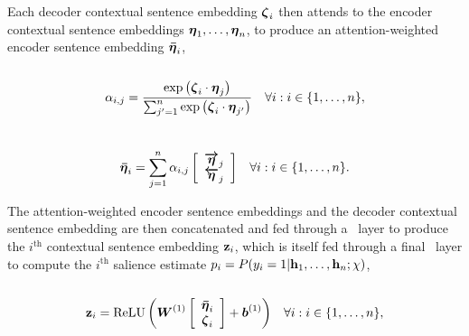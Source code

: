

\clearpage

Each decoder contextual sentence embedding $\boldsymbol{\zeta}_i$ then attends to
the encoder contextual sentence embeddings $\boldsymbol{\eta}_1,\ldots,
\boldsymbol{\eta}_n$, to produce an attention-weighted encoder sentence
embedding $\boldsymbol{\bar{\eta}}_i$,\\
    
\\[-20pt]
\begin{align}
    \alpha_{i,j} & = 
        \frac{\exp \left(\boldsymbol{\zeta}_i \cdot  \boldsymbol{\eta}_j \right)}{
            \sum_{j^\prime=1}^{n}\exp\left(  
                \boldsymbol{\zeta}_i \cdot  \boldsymbol{\eta}_{j^\prime} \right)} &
    \forall i : i \in \{1,\ldots,n\}, 
\end{align}
\\[-20pt]
\begin{align}
    \boldsymbol{\bar{\eta}}_i & = 
        \sum_{j=1}^{n} \alpha_{i,j} \left[\begin{array}{c}
            \boldsymbol{\overrightarrow{\eta}}_j\\ 
            \boldsymbol{\overleftarrow{\eta}}_j\end{array}\right] & 
    \forall i : i \in \{1,\ldots,n\}.
\end{align}

The attention-weighted encoder sentence embeddings and the decoder contextual
sentence embedding are then concatenated and fed through a \feedforward~layer
to produce the $i^\textrm{th}$ contextual sentence embedding $\mathbf{z}_i$,
which is itself fed through a final \feedforward~layer to compute the
$i^\textrm{th}$ salience estimate $p_i =
P(y_i=1|\mathbf{h}_1,\ldots,\mathbf{h}_n;\chi)$,\\

\\[-20pt]
\begin{align}
    \mathbf{z}_i &= \operatorname{ReLU}\left(\boldsymbol{W}^{(1)} \left[\begin{array}{c}
        \boldsymbol{\bar{\eta}}_i \\ 
        \boldsymbol{\zeta}_i \end{array}\right] 
        + \boldsymbol{b}^{(1)} \right) &
    \forall i : i \in \{1,\ldots,n\},
\end{align}


